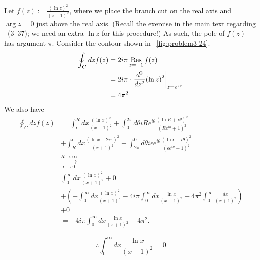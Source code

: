 Let $f(z) := \frac{{\left( \ln z \right)}^2}{{\left( z + 1 \right)}^2}$,
where we place the branch cut on the real axis and $\arg z = 0$ just above the real axis.
(Recall the exercise in the main text regarding ~(3--37);
we need an extra $\ln z$ for this procedure!)
As such, the pole of $f(z)$ has argument $\pi$.
Consider the contour shown in ~\ref{fig:problem3-24}.
\begin{align*}
	\oint_C dz f(z)
	&= 2i\pi \mathop{\mathrm{Res}}_{z=-1} f(z) \\
	&= 2i\pi \cdot {\left. \frac{d^2}{dz^2} {\left( \ln z \right)}^2 \right|}_{z = e^{i\pi}} \\
	&= 4\pi^2
\end{align*}
We also have
\begin{align*} %
    \oint_C dz f(z)
    &= \int_\epsilon^R dx \frac{{\left( \ln x \right)}^2}{{\left( x + 1 \right)}^2}
      + \int_0^{2\pi} d\theta iRe^{i\theta} \frac{{\left( \ln R + i\theta\right)}^2}{{\left( Re^{i\theta} + 1 \right)}^2} \\
    & + \int_R^\epsilon dx \frac{{\left( \ln x + 2i\pi \right)}^2}{{\left( x + 1 \right)}^2}
      + \int_{2\pi}^0 d\theta i\epsilon e^{i\theta} \frac{{\left(\ln\epsilon + i\theta\right)}^2}{{\left( \epsilon e^{i\theta} + 1 \right)}^2} \\
    &\xrightarrow[\epsilon \rightarrow 0]{R \rightarrow \infty} \\
    &   \int_0^\infty dx \frac{{\left( \ln x \right)}^2}{{\left( x + 1 \right)}^2} + 0 \\
    & + \left( - \int_0^\infty dx \frac{{\left( \ln x \right)}^2}{{\left( x + 1 \right)}^2}
      - 4i\pi \int_0^\infty dx \frac{\ln x}{{\left( x + 1 \right)}^2}
      + 4\pi^2 \int_0^\infty \frac{dx}{{\left( x + 1 \right)}^2} \right) \\
    & + 0 \\
    &= -4i\pi \int_0^\infty dx \frac{\ln x}{{\left( x + 1 \right)}^2} + 4\pi^2.
\end{align*}

\[
	\therefore \int_0^\infty dx \frac{\ln x}{{\left( x + 1 \right)}^2} = 0
\]
